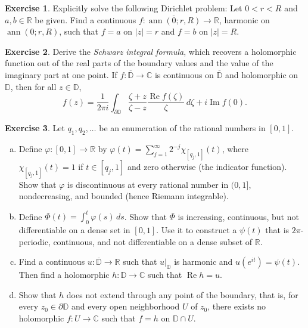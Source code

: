\documentclass[12pt,openany]{book}
\newcommand{\ann}{\operatorname{ann}}
\renewcommand{\Re}{\operatorname{Re}}
\renewcommand{\Im}{\operatorname{Im}}
\newcommand{\sabs}[1]{\lvert {#1} \rvert}
\newcommand{\C}{{\mathbb{C}}}
\newcommand{\R}{{\mathbb{R}}}
\newcommand{\D}{{\mathbb{D}}}
\newcommand{\myindex}[1]{#1\index{#1}}
\theoremstyle{plain}
\theoremstyle{remark}
\theoremstyle{definition}
\newenvironment{exbox}{%
    \def\FrameCommand{\vrule width 1pt \relax\hspace{10pt}}%
    \MakeFramed{\advance\hsize-\width\FrameRestore}%
}{%
    \endMakeFramed
}
\newenvironment{exparts}{%
    \leavevmode\begin{enumerate}[a),noitemsep,topsep=0pt,parsep=0pt,partopsep=0pt]
}{%
    \end{enumerate}
}
\theoremstyle{exercise}
\newtheorem{exercise}{Exercise}[section]
\theoremstyle{example}
\begin{document}
\begin{exbox}
\begin{exercise}
Explicitly solve the following Dirichlet problem:  Let $0 < r < R$ and $a,b
\in \R$ be given.  Find a continuous $f \colon \overline{\ann(0;r,R)} \to
\R$, harmonic on $\ann(0;r,R)$, such that $f=a$ on $\sabs{z}=r$ and $f=b$
on $\sabs{z}=R$.
\end{exercise}

\begin{exercise}
Derive the \emph{\myindex{Schwarz integral formula}}, which recovers
a holomorphic function out of the real parts of the boundary values
and the value of the imaginary part at one point.
If $f \colon \overline{\D} \to \C$ is continuous on $\overline{\D}$
and holomorphic on
$\D$, then for all $z \in \D$,
\begin{equation*}
f(z) =
\frac{1}{2\pi i}
\int_{\partial \D}
\frac{\zeta+z}{\zeta-z} \frac{\Re f(\zeta)}{\zeta} \, d\zeta
+ i \Im f(0) .
\end{equation*}
\end{exercise}

\begin{exercise}
Let $q_1,q_2,\ldots$ be an enumeration of the rational
numbers in $[0,1]$.
\begin{exparts}
\item
Define $\varphi \colon [0,1] \to {\mathbb R}$
by $\varphi(t) = \sum_{j=1}^\infty 2^{-j} \chi_{[q_j,1]}(t)$,
where $\chi_{[q_j,1]}(t) = 1$ if $t \in [q_j,1]$ and
zero otherwise (the indicator function).  Show that
$\varphi$ is discontinuous at every rational number in $(0,1]$,
nondecreasing, and bounded (hence Riemann integrable).
\item
Define $\Phi(t) = \int_0^t \varphi(s)\, ds$.
Show that $\Phi$
is increasing, continuous, but not differentiable
on a dense set in $[0,1]$.  Use it to construct a
$\psi(t)$ that is $2\pi$-periodic, continuous, and 
not differentiable on a dense subset of $\R$.
\item
Find a continuous $u \colon \overline{\D} \to \R$
such that $u|_{\D}$ is harmonic and
$u(e^{it}) = \psi(t)$.  Then find a holomorphic $h \colon \D \to \C$
such that $\Re h = u$.
\item
Show that $h$ does not extend through any point of
the boundary, that is, for every
$z_0 \in \partial \D$ and every open neighborhood
$U$ of $z_0$, there exists no holomorphic $f \colon U \to \C$
such that $f = h$ on $\D \cap U$.
\end{exparts}
\end{exercise}
\end{exbox}
\end{document}
